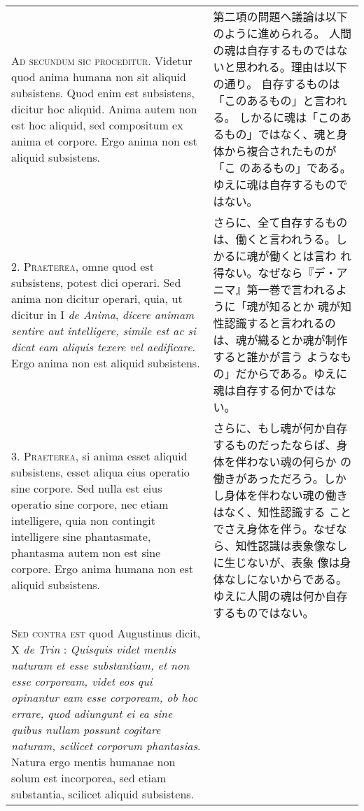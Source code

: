 \documentclass[paper=a4paper,fontsize=10pt,jafontsize=9pt,titlepage]{jlreq}
\begin{document}
\begin{longtable}{p{21em}p{21em}}



{\scshape Ad secundum sic proceditur}. Videtur quod anima humana non sit aliquid
subsistens. Quod enim est subsistens, dicitur hoc aliquid. Anima autem
non est hoc aliquid, sed compositum ex anima et corpore. Ergo anima
non est aliquid subsistens.


&

第二項の問題へ議論は以下のように進められる。
人間の魂は自存するものではないと思われる。理由は以下の通り。
自存するものは「このあるもの」と言われる。
しかるに魂は「このあるもの」ではなく、魂と身体から複合されたものが「こ
 のあるもの」である。ゆえに魂は自存するものではない。

\\



2. {\scshape Praeterea}, omne quod est subsistens, potest dici operari. Sed anima
non dicitur operari, quia, ut dicitur in I {\itshape de Anima}, {\itshape dicere animam
sentire aut intelligere, simile est ac si dicat eam aliquis texere vel
aedificare}. Ergo anima non est aliquid subsistens.


&

さらに、全て自存するものは、働くと言われうる。しかるに魂が働くとは言わ
 れ得ない。なぜなら『デ・アニマ』第一巻で言われるように「魂が知るとか
 魂が知性認識すると言われるのは、魂が織るとか魂が制作すると誰かが言う
 ようなもの」だからである。ゆえに魂は自存する何かではない。

\\



3. {\scshape Praeterea}, si anima esset aliquid subsistens, esset aliqua eius
operatio sine corpore. Sed nulla est eius operatio sine corpore, nec
etiam intelligere, quia non contingit intelligere sine phantasmate,
phantasma autem non est sine corpore. Ergo anima humana non est
aliquid subsistens.


&

さらに、もし魂が何か自存するものだったならば、身体を伴わない魂の何らか
の働きがあっただろう。しかし身体を伴わない魂の働きはなく、知性認識する
ことでさえ身体を伴う。なぜなら、知性認識は表象像なしに生じないが、表象
像は身体なしにないからである。ゆえに人間の魂は何か自存するものではない。

\\



{\scshape Sed contra est} quod Augustinus dicit, X {\itshape de Trin} : {\itshape Quisquis videt mentis
naturam et esse substantiam, et non esse corpoream, videt eos qui
opinantur eam esse corpoream, ob hoc errare, quod adiungunt ei ea sine
quibus nullam possunt cogitare naturam, scilicet corporum
phantasias}. Natura ergo mentis humanae non solum est incorporea, sed
etiam substantia, scilicet aliquid subsistens.



\end{longtable}
\end{document}
